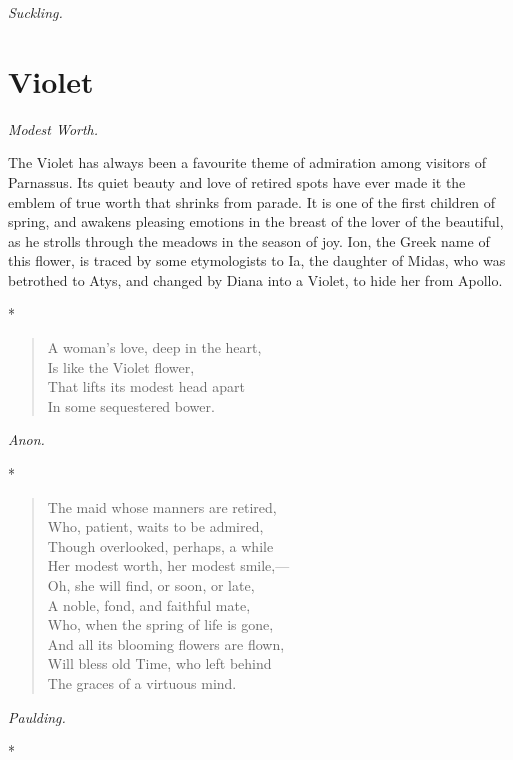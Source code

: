 \documentclass[11pt,twoside]{article}
\newcommand\flower[2]{\section*{#1}\addcontentsline{toc}{section}{#1}%
  \noindent\textit{#2.}\par\medskip}
\newcommand\stars{\begin{center}*\quad*\quad*\end{center}}
\newcommand\by[1]{\par\hfill\textit{#1}\par}
\begin{document}
\by{Suckling.}

\flower{Violet}{Modest Worth}

The Violet has always been a favourite theme of admiration among visitors of Parnassus. Its quiet beauty and love of retired spots have ever made it the emblem of true worth that shrinks from parade. It is one of the first children of spring, and awakens pleasing emotions in the breast of the lover of the beautiful, as he strolls through the meadows in the season of joy. Ion, the Greek name of this flower, is traced by some etymologists to Ia, the daughter of Midas, who was betrothed to Atys, and changed by Diana into a Violet, to hide her from Apollo.

\stars

\begin{verse}
A woman’s love, deep in the heart,\\
\quad Is like the Violet flower,\\
That lifts its modest head apart\\
\quad In some sequestered bower.
\end{verse}

\by{Anon.}

\stars

\begin{verse}
The maid whose manners are retired,\\
Who, patient, waits to be admired,\\
Though overlooked, perhaps, a while\\
Her modest worth, her modest smile,---\\
Oh, she will find, or soon, or late,\\
A noble, fond, and faithful mate,\\
Who, when the spring of life is gone,\\
And all its blooming flowers are flown,\\
Will bless old Time, who left behind\\
The graces of a virtuous mind.
\end{verse}

\by{Paulding.}

\stars
\end{document}
